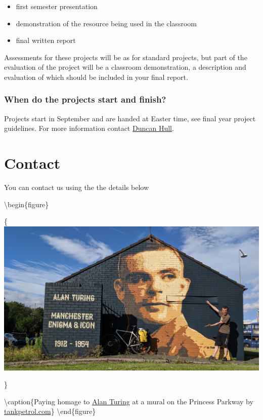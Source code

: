 \documentclass[12pt,]{book}
\providecommand{\tightlist}{%
  \setlength{\itemsep}{0pt}\setlength{\parskip}{0pt}}
\begin{document}
\begin{itemize}
\tightlist
\item
  first semester presentation
\item
  demonstration of the resource being used in the classroom
\item
  final written report
\end{itemize}

Assessments for these projects will be as for standard projects, but part of the evaluation of the project will be a classroom demonstration, a description and evaluation of which should be included in your final report.

\hypertarget{when-do-the-projects-start-and-finish}{%
\subsection{When do the projects start and finish?}\label{when-do-the-projects-start-and-finish}}

Projects start in September and are handed at Easter time, see final year project guidelines. For more information contact \protect\hyperlink{contact}{Duncan Hull}.

\hypertarget{contact}{%
\chapter{Contact}\label{contact}}

You can contact us using the the details below

\textbackslash{}begin\{figure\}

\{\centering \includegraphics[width=1\linewidth]{images/turingicon}

\}

\textbackslash{}caption\{Paying homage to \href{https://en.wikipedia.org/wiki/Alan_Turing}{Alan Turing} at a mural on the Princess Parkway by \href{http://tankpetrol.com/}{tankpetrol.com}\}\label{fig:unnamed-chunk-9}
\textbackslash{}end\{figure\}
\end{document}

